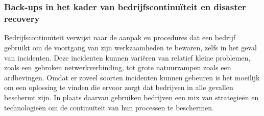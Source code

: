 \chapter{}%
\label{ch:stand-van-zaken}






\subsection{Back-ups in het kader van bedrijfscontinuïteit en disaster recovery}
Bedrijfscontinuïteit verwijst naar de aanpak en procedures dat een bedrijf gebruikt om de voortgang van zijn werkzaamheden te bewaren, zelfs in het geval van incidenten. Deze incidenten kunnen variëren van relatief kleine problemen, zoals een gebroken netwerkverbinding, tot grote natuurrampen zoals een ardbevingen. Omdat er zoveel soorten incidenten kunnen gebeuren is het moeilijk om een oplossing te vinden die ervoor zorgt dat bedrijven in alle gevallen beschermt zijn. In plaats daarvan gebruiken bedrijven een mix van strategieën en technologieën om de continuïteit van hun processen te beschermen. 


